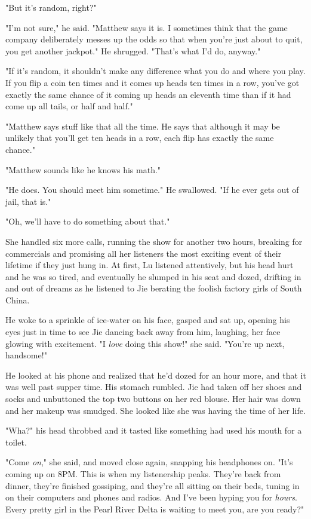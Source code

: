 "But it's random, right?"

"I'm not sure," he said. "Matthew says it is. I sometimes think
that the game company deliberately messes up the odds so that when
you're just about to quit, you get another jackpot." He shrugged.
"That's what I'd do, anyway."

"If it's random, it shouldn't make any difference what you do and
where you play. If you flip a coin ten times and it comes up heads
ten times in a row, you've got exactly the same chance of it coming
up heads an eleventh time than if it had come up all tails, or half
and half."

"Matthew says stuff like that all the time. He says that although
it may be unlikely that you'll get ten heads in a row, each flip
has exactly the same chance."

"Matthew sounds like he knows his math."

"He does. You should meet him sometime." He swallowed. "If he ever
gets out of jail, that is."

"Oh, we'll have to do something about that."

She handled six more calls, running the show for another two hours,
breaking for commercials and promising all her listeners the most
exciting event of their lifetime if they just hung in. At first, Lu
listened attentively, but his head hurt and he was so tired, and
eventually he slumped in his seat and dozed, drifting in and out of
dreams as he listened to Jie berating the foolish factory girls of
South China.

He woke to a sprinkle of ice-water on his face, gasped and sat up,
opening his eyes just in time to see Jie dancing back away from
him, laughing, her face glowing with excitement. "I \emph{love}
doing this show!" she said. "You're up next, handsome!"

He looked at his phone and realized that he'd dozed for an hour
more, and that it was well past supper time. His stomach rumbled.
Jie had taken off her shoes and socks and unbuttoned the top two
buttons on her red blouse. Her hair was down and her makeup was
smudged. She looked like she was having the time of her life.

"Wha?" his head throbbed and it tasted like something had used his
mouth for a toilet.

"Come \emph{on}," she said, and moved close again, snapping his
headphones on. "It's coming up on 8PM. This is when my listenership
peaks. They're back from dinner, they're finished gossiping, and
they're all sitting on their beds, tuning in on their computers and
phones and radios. And I've been hyping you for \emph{hours}. Every
pretty girl in the Pearl River Delta is waiting to meet you, are
you ready?"

